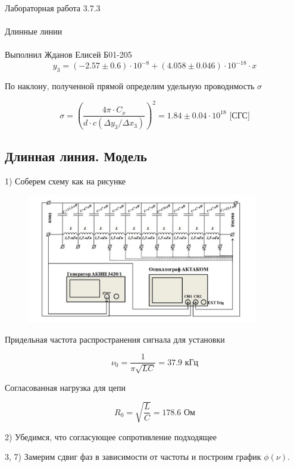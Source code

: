 \documentclass{astroedu-lab}
\begin{document}
\begin{problem}{\huge Лабораторная работа 3.7.3\\\\Длинные линии\\\\Выполнил Жданов Елисей Б01-205}
\begin{equation}
	y_3 = (-2.57 \pm 0.6) \cdot 10^{-8} + (4.058 \pm 0.046)\cdot 10^{-18}\cdot x
\end{equation}

По наклону, полученной прямой определим удельную проводнмость $\sigma$

$$
\sigma=\left(\frac{4 \pi \cdot C_x}{d \cdot c\left(\Delta y_3 / \Delta x_3\right)}\right)^2 = 1.84 \pm 0.04 \cdot 10^{18} \text{ [СГС]}
$$

\subsection{Длинная линия. Модель}

\newpage

1) Соберем схему как на рисунке

\begin{figure}[!h]
	\centering
	\includegraphics[width=0.9\textwidth]{установка2.png}
	\label{fig:boiler}
\end{figure}

Придельная частота распространения сигнала для установки

\begin{equation}
	\nu_0 = \frac{1}{\pi \sqrt{L C}} = 37.9 \text{ кГц}
\end{equation}

Согласованная нагрузка для цепи

\begin{equation}
	R_0 = \sqrt{\frac{L}{C}} = 178.6 \text{ Ом}
\end{equation}

2) Убедимся, что согласующее сопротивление подходящее

3, 7) Замерим сдвиг фаз в зависимости от частоты и построим график $\phi(\nu)$.


\end{problem}
\end{document}
